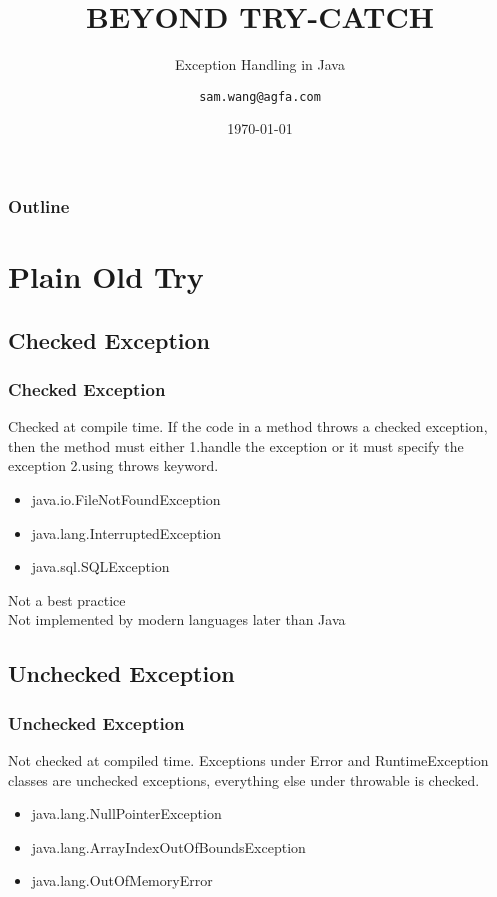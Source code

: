 \documentclass{beamer}
\title{BEYOND TRY-CATCH}
\subtitle{Exception Handling in Java}
\author{\texttt{sam.wang@agfa.com}}
\institute{Shanghai}
\date{\today}
\begin{document}
\begin{frame}
	\titlepage
\end{frame}

\begin{frame}
	\frametitle{Outline}
	\tableofcontents %
\end{frame}

\section{Plain Old Try}
\subsection{Checked Exception}
\begin{frame}
  \frametitle{Checked Exception}
  \begin{definition}
    Checked at compile time. If the code in a method throws a checked exception, then the method must either \alert{1.handle the exception} or it must specify the exception \alert{2.using throws} keyword.
  \end{definition}
  \begin{example}
    \begin{itemize}
    \item java.io.FileNotFoundException
    \item java.lang.InterruptedException
    \item java.sql.SQLException
    \end{itemize}
  \end{example}
\begin{uncoverenv} %
Not a best practice
\\Not implemented by modern languages later than Java
\end{uncoverenv}
\end{frame}

\subsection{Unchecked Exception}
\begin{frame}
  \frametitle{Unchecked Exception}
  \begin{definition}
    Not checked at compiled time. Exceptions under \alert{Error} and \alert{RuntimeException} classes are unchecked exceptions, everything else under throwable is checked.
  \end{definition}
  \begin{example}
    \begin{itemize}
    \item java.lang.NullPointerException
    \item java.lang.ArrayIndexOutOfBoundsException
    \item java.lang.OutOfMemoryError
    \end{itemize}
  \end{example}
\end{frame}
\end{document}

